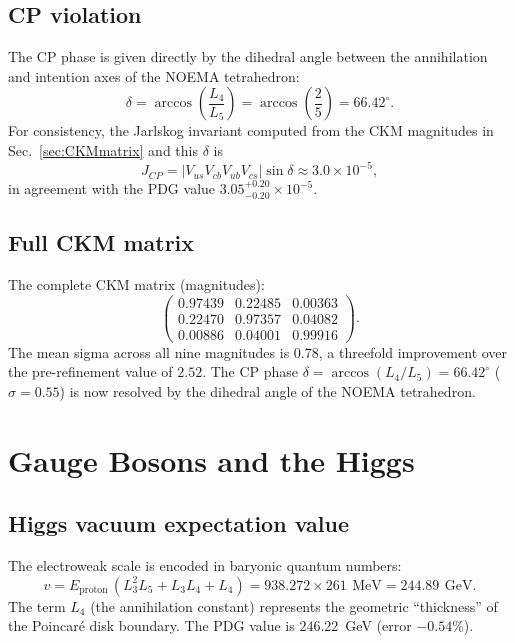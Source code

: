 \documentclass[aps,prd,reprint,twocolumn,showpacs,superscriptaddress]{revtex4-2}
\newcommand{\mev}{\,\text{MeV}}
\newcommand{\gev}{\,\text{GeV}}
\begin{document}
\subsection{CP violation}

The CP phase is given directly by the dihedral angle between the
annihilation and intention axes of the NOEMA tetrahedron:
\begin{equation}
\delta = \arccos\left(\frac{L_4}{L_5}\right)
       = \arccos\left(\frac{2}{5}\right)
       = 66.42^\circ.
\end{equation}
For consistency, the Jarlskog invariant computed from the CKM
magnitudes in Sec.~\ref{sec:CKMmatrix} and this $\delta$ is
\begin{equation}
J_{CP} = |V_{us}V_{cb}V_{ub}V_{cs}|\sin\delta
       \approx 3.0 \times 10^{-5},
\end{equation}
in agreement with the PDG value $3.05^{+0.20}_{-0.20}\times 10^{-5}$.

\subsection{Full CKM matrix}

The complete CKM matrix (magnitudes):
\[
\begin{pmatrix}
0.97439 & 0.22485 & 0.00363 \\
0.22470 & 0.97357 & 0.04082 \\
0.00886 & 0.04001 & 0.99916
\end{pmatrix}.
\]
The mean sigma across all nine magnitudes is $0.78$, a
threefold improvement over the pre-refinement value of $2.52$.
The CP phase $\delta = \arccos(L_4/L_5) = 66.42^\circ$ ($\sigma = 0.55$)
is now resolved by the dihedral angle of the NOEMA tetrahedron.

\section{Gauge Bosons and the Higgs}
\label{sec:gauge}

\subsection{Higgs vacuum expectation value}

The electroweak scale is encoded in baryonic quantum numbers:
\begin{equation}
v = E_{\text{proton}}\,(L_3^2 L_5 + L_3 L_4 + L_4)
  = 938.272 \times 261\ \mev
  = 244.89\ \gev.
\end{equation}
The term $L_4$ (the annihilation constant) represents the geometric
``thickness'' of the Poincar\'{e} disk boundary.  The PDG value is
$246.22$~GeV (error $-0.54\%$).
\end{document}

